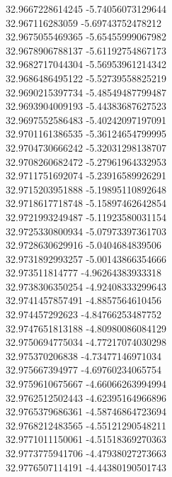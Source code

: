 {32.9667228614245	-5.74056073129644\\
32.967116283059	-5.69743752478212\\
32.9675055469365	-5.65455999067982\\
32.9678906788137	-5.61192754867173\\
32.9682717044304	-5.56953961214342\\
32.9686486495122	-5.52739558825219\\
32.9690215397734	-5.48549487799487\\
32.9693904009193	-5.44383687627523\\
32.9697552586483	-5.40242097197091\\
32.9701161386535	-5.36124654799995\\
32.9704730666242	-5.32031298138707\\
32.9708260682472	-5.27961964332953\\
32.9711751692074	-5.23916589926291\\
32.9715203951888	-5.19895110892648\\
32.9718617718748	-5.15897462642854\\
32.9721993249487	-5.11923580031154\\
32.9725330800934	-5.07973397361703\\
32.9728630629916	-5.0404684839506\\
32.9731892993257	-5.00143866354666\\
32.973511814777	-4.96264383933318\\
32.9738306350254	-4.92408333299643\\
32.9741457857491	-4.8857564610456\\
32.974457292623	-4.84766253487752\\
32.9747651813188	-4.80980086084129\\
32.9750694775034	-4.77217074030298\\
32.975370206838	-4.73477146971034\\
32.975667394977	-4.69760234065754\\
32.9759610675667	-4.66066263994994\\
32.9762512502443	-4.62395164966896\\
32.9765379686361	-4.58746864723694\\
32.9768212483565	-4.55121290548211\\
32.9771011150061	-4.51518369270363\\
32.9773775941706	-4.47938027273663\\
32.9776507114191	-4.44380190501743\\
}

